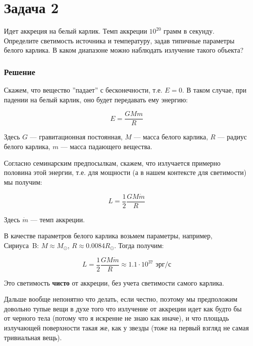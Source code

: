 \documentclass[a4paper, 12pt]{article}
\begin{document}
\section*{Задача 2}

Идет аккреция на белый карлик. Темп аккреции $10^{20}$ грамм в секунду. Определите светимость источника и температуру, задав типичные параметры белого карлика. В каком диапазоне можно наблюдать излучение такого объекта?

\subsubsection*{Решение}

Скажем, что вещество ''падает'' с бесконечности, т.е. $E = 0$. В таком случае, при падении на белый карлик, оно будет передавать ему энергию:

\begin{equation}
	E = \frac{G M m}{R}
\end{equation}

Здесь $G$ --- гравитационная постоянная, $M$ --- масса белого карлика, $R$ --- радиус белого карлика, $m$ --- масса падающего вещества.

Согласно семинарским предпосылкам, скажем, что излучается примерно половина этой энергии, т.е. для мощности (а в нашем контексте для светимости) мы получим:

\begin{equation}
	L = \frac{1}{2} \frac{G M \dot{m}}{R}
\end{equation}

Здесь $\dot{m}$ --- темп аккреции.

В качестве параметров белого карлика возьмем параметры, например, Сириуса~B: $M \approx M_{\odot}$, $R \approx 0.0084 R_{\odot}$. Тогда получим:

\begin{equation}
	\boxed{L = \frac{1}{2} \frac{G M \dot{m}}{R} \approx 1.1 \cdot 10^{37} \text{ эрг/с}}
\end{equation}

Это светимость \textbf{чисто} от аккреции, без учета светимости самого карлика.

Дальше вообще непонятно что делать, если честно, поэтому мы предположим довольно тупые вещи в духе того что излучение от аккреции идет как будто бы от черного тела (потому что я искренне не знаю как иначе), и что площадь излучающей поверхности такая же, как у звезды (тоже на первый взгляд не самая тривиальная вещь).
\end{document}
